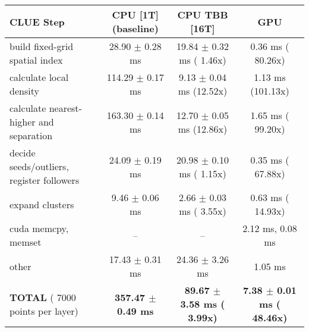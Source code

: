     \begin{tabular}{l|c|c|c}
    \hline
    CLUE Step                                 & CPU [1T] (baseline)         & CPU TBB [16T]                         & GPU                       \\ \hline
    build fixed-grid spatial index            &  28.90 $\pm$  0.28 ms       &  19.84 $\pm$  0.32 ms ( 1.46x)        &   0.36 ms ( 80.26x)       \\
    calculate local density                   & 114.29 $\pm$  0.17 ms       &   9.13 $\pm$  0.04 ms (12.52x)        &   1.13 ms (101.13x)       \\
    calculate nearest-higher and separation   & 163.30 $\pm$  0.14 ms       &  12.70 $\pm$  0.05 ms (12.86x)        &   1.65 ms ( 99.20x)       \\
    decide seeds/outliers, register followers &  24.09 $\pm$  0.19 ms       &  20.98 $\pm$  0.10 ms ( 1.15x)        &   0.35 ms ( 67.88x)       \\
    expand clusters                           &   9.46 $\pm$  0.06 ms       &   2.66 $\pm$  0.03 ms ( 3.55x)        &   0.63 ms ( 14.93x)       \\ \hline
    cuda memcpy, memset                       & --                          & --                                    &   2.12 ms,   0.08 ms      \\ 
    other                                     &  17.43 $\pm$  0.31 ms       &  24.36 $\pm$  3.26 ms                 &   1.05 ms                 \\ \hline
    \textbf{TOTAL} ( 7000 points per layer)   & \textbf{357.47 $\pm$  0.49 ms} & \textbf{ 89.67 $\pm$  3.58 ms ( 3.99x)} & \textbf{  7.38 $\pm$  0.01 ms ( 48.46x)}  \\
    \hline 
    \end{tabular}
    \linebreak


